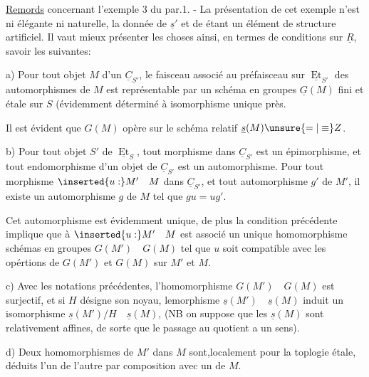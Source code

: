 
\uline{Remords} concernant l'exemple 3 du par.1. - La présentation de cet exemple n'est ni élégante ni naturelle, la donnée de $\underline{s}'$ et de \quad étant un élément de structure artificiel. Il vaut mieux présenter les choses ainsi, en termes de conditions sur $\underline{R}$, savoir les suivantes:

a) Pour tout objet $M$ d'un $\underline{C}_{S'}$, le faisceau  associé au préfaisceau sur $\underline{\operatorname{Et}}_{S'}$ des automorphismes de $M$ est  représentable par un schéma en groupes $\underline{G}(M)$ fini et étale sur $S$ (évidemment déterminé à isomorphisme unique près.

Il est évident que $G(M)$ opère sur le schéma relatif $\underline{s}(M)\unsure{=|\equiv}Z$.

b) Pour tout objet $S'$ de $\underline{\operatorname{Et}}_S$, tout morphisme  dans $\underline{C}_{S'}$ est un épimorphisme, et tout endomorphisme d'un objet de $\underline{C}_{S'}$ est un automorphisme. Pour tout morphisme $\inserted{u:}M'\quad M$ dans $\underline{C}_{S'}$, et tout automorphisme $g'$ de $M'$, il existe un automorphisme $g$ de $M$ tel que $gu=ug'$.

Cet automorphisme est évidemment unique, de plus la condition précédente implique que à $\inserted{u:}M'\quad M$ est associé un unique homomorphisme  schémas en groupes $G(M')\quad G(M)$ tel que $u$ soit compatible avec les opértions de $G(M')$ et $G(M)$ sur $M'$ et $M$.

c) Avec les notations précédentes,  l'homomorphisme $G(M')\quad G(M)$ est surjectif, et si $H$ désigne son noyau, lemorphisme $\underline{s}(M')\quad\underline{s}(M)$ induit un  isomorphisme $\underline{s}(M')/H\quad\underline{s}(M)$,  (NB on suppose que les $\underline{s}(M)$ sont  relativement affines, de sorte que le passage au quotient a un sens).

d) Deux homomorphismes de $M'$ dans $M$ sont,localement pour la toplogie étale, déduits l'un de l'autre par composition avec un  de $M$.
